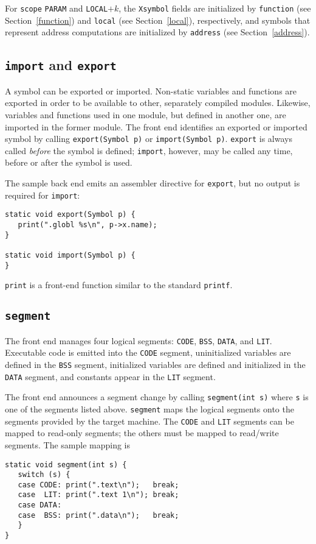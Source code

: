 For \verb|scope| \verb|PARAM| and  \verb|LOCAL|$+k$,
the \verb|Xsymbol| fields are initialized
by \verb|function| (see Section~\ref{function})
and \verb|local| (see Section~\ref{local}), respectively,
and symbols that represent address computations
are initialized by \verb|address| (see Section~\ref{address}).

\subsection{{\tt import} and \tt export}

\label{import}\label{export}
A symbol can be exported or imported.
Non-static variables and functions are exported
in order to be available to other,
separately compiled modules. Likewise, variables and functions used
in one module, but defined in another one, are imported
in the former module.
The front end identifies an exported or imported symbol
by calling \verb|export(Symbol p)| or \verb|import(Symbol p)|. \verb|export|
is always called {\em before} the symbol is defined;
\verb|import|, however, may be called any time, before or after the symbol
is used.

The sample back end emits an assembler directive for \verb|export|,
but no output is required for \verb|import|:
\begin{verbatim}
static void export(Symbol p) {
   print(".globl %s\n", p->x.name);
}

static void import(Symbol p) {
}
\end{verbatim}
\verb|print| is a front-end function similar to the standard \verb|printf|.

\subsection{\tt segment}

\label{segment}
The front end manages four logical segments:
\verb|CODE|, \verb|BSS|, \verb|DATA|, and \verb|LIT|.
Executable code is emitted into the \verb|CODE| segment,
uninitialized variables are defined in the \verb|BSS| segment,
initialized variables are defined and initialized in the \verb|DATA| segment,
and constants appear in the \verb|LIT| segment.

The front end announces a segment change by calling
\verb|segment(int s)| where \verb|s| is one of the segments listed above.
\verb|segment| maps the logical segments onto the segments
provided by the target machine. The \verb|CODE| and \verb|LIT| segments
can be mapped to read-only segments; the others must be mapped to read/write segments.
The sample mapping is
\begin{verbatim}
static void segment(int s) {
   switch (s) {
   case CODE: print(".text\n");   break;
   case  LIT: print(".text 1\n"); break;
   case DATA:
   case  BSS: print(".data\n");   break;
   }
}
\end{verbatim}

